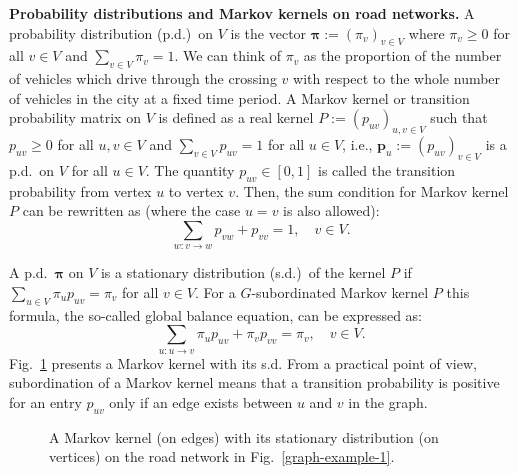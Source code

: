 \documentclass[b5paper,12pt]{report}
\theoremstyle{definition}
\newcommand{\bp}{\boldsymbol{p}}
\newcommand{\bpi}{\boldsymbol{\pi}}
\begin{document}
\textbf{Probability distributions and Markov kernels on road networks.} A probability distribution (p.d.)~on $V$ is the vector $\bpi := (\pi_v)_{v \in V}$ where $\pi_v \geq 0$ for all $v \in V$ and $\sum_{v \in V} \pi_v = 1$. We can think of $\pi_v$ as the proportion of the number of vehicles which drive through the crossing $v$ with respect to the whole number of vehicles in the city at a fixed time period. A Markov kernel or transition probability matrix on $V$ is defined as a real kernel $P := (p_{uv})_{u,v \in V}$ such that $p_{uv} \geq 0$ for all $u, v \in V$ and $\sum_{v \in V} p_{uv} = 1$ for all $u \in V$, i.e., $\bp_u := (p_{uv})_{v \in V}$ is a p.d.~on $V$ for all $u \in V$. The quantity $p_{uv} \in [0, 1]$ is called the transition probability from vertex $u$ to vertex $v$. Then, the sum condition for Markov kernel $P$ can be rewritten as (where the case $u = v$ is also allowed):
\begin{equation}\label{Psum}
\sum_{w:v \rightarrow w} p_{vw} + p_{vv} = 1, \quad v \in V.
\end{equation}

A p.d.~$\bpi$ on $V$ is a stationary distribution (s.d.)~of the kernel $P$ if $\sum_{u \in V} \pi_u p_{uv} = \pi_v$ for all $v \in V$. For a $G$-subordinated Markov kernel $P$ this formula, the so-called global balance equation, can be expressed as:
\begin{equation}\label{pi_eq}
\sum_{u:u \rightarrow v} \pi_u p_{uv} + \pi_v p_{vv} = \pi_v, \quad v \in V.
\end{equation}
Fig.~\ref{pi_graph} presents a Markov kernel with its s.d. From a practical point of view, subordination of a Markov kernel means that a transition probability is positive for an entry $p_{uv}$ only if an edge exists between $u$ and $v$ in the graph.

\begin{figure}[b!]
\centering
{}
\caption{A Markov kernel (on edges) with its stationary distribution (on vertices) on the road network in Fig.~\ref{graph-example-1}.}
\label{pi_graph}
\end{figure}
\end{document}
